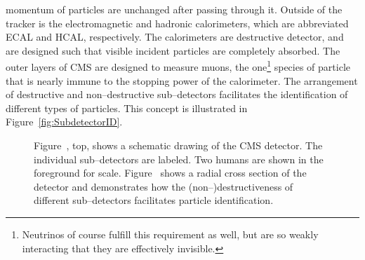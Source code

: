 momentum of particles are unchanged after passing through it.  Outside of the
tracker is the electromagnetic and hadronic calorimeters, which are abbreviated
ECAL and HCAL, respectively.  The calorimeters are destructive detector,
and are designed such that visible incident particles are completely absorbed.
The outer layers of CMS are designed to measure muons, the
one\footnote{Neutrinos of course fulfill this requirement as well, but are so
weakly interacting that they are effectively invisible.} species of particle
that is nearly immune to the stopping power of the calorimeter.  The arrangement of
destructive and non--destructive sub--detectors facilitates the identification
of different types of particles.  This concept is illustrated in
Figure~\ref{fig:SubdetectorID}.
\begin{figure}
  \centering
   \caption[Schematic drawings of the CMS
  detector]{Figure~, top, shows a schematic drawing of
  the CMS detector.  The individual sub--detectors are labeled.  Two humans are
  shown in the foreground for scale. Figure~ shows a
  radial cross section of the detector and demonstrates how the
  \mbox{(non--)destructiveness} of different sub--detectors facilitates particle
  identification.} \label{fig:AllCMSCutaways}
\end{figure}
